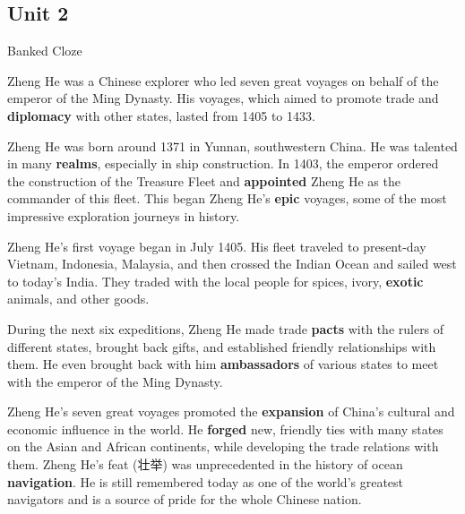 \newpage

\subsection{Unit 2}

\begin{question}{Banked Cloze}

Zheng He was a Chinese explorer who led seven great voyages on behalf of the emperor of the Ming Dynasty. His voyages, which aimed to promote trade and \textbf{\color{red} diplomacy} with other states, lasted from 1405 to 1433.

\vspace{1em}

Zheng He was born around 1371 in Yunnan, southwestern China. He was talented in many \textbf{\color{red} realms}, especially in ship construction. In 1403, the emperor ordered the construction of the Treasure Fleet and \textbf{\color{red} appointed} Zheng He as the commander of this fleet. This began Zheng He's \textbf{\color{red} epic} voyages, some of the most impressive exploration journeys in history.

\vspace{1em}

Zheng He's first voyage began in July 1405. His fleet traveled to present-day Vietnam, Indonesia, Malaysia, and then crossed the Indian Ocean and sailed west to today's India. They traded with the local people for spices, ivory, \textbf{\color{red} exotic} animals, and other goods.

\vspace{1em}

During the next six expeditions, Zheng He made trade \textbf{\color{red} pacts} with the rulers of different states, brought back gifts, and established friendly relationships with them. He even brought back with him \textbf{\color{red} ambassadors} of various states to meet with the emperor of the Ming Dynasty.

\vspace{1em}

Zheng He's seven great voyages promoted the \textbf{\color{red} expansion} of China's cultural and economic influence in the world. He \textbf{\color{red} forged} new, friendly ties with many states on the Asian and African continents, while developing the trade relations with them. Zheng He's feat (壮举) was unprecedented in the history of ocean \textbf{\color{red} navigation}. He is still remembered today as one of the world's greatest navigators and is a source of pride for the whole Chinese nation.

\end{question}

